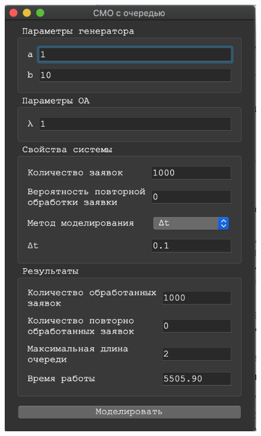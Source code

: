 \documentclass[a4paper,12pt]{article}
\begin{document}
	\begin{figure}[h!]
		\begin{minipage}[b]{0.32\textwidth}
			\includegraphics[width=\textwidth]{deltat_1_1.png}
		\end{minipage}
		\begin{minipage}[b]{0.32\textwidth}

\end{minipage}
\end{figure}
\end{document}
